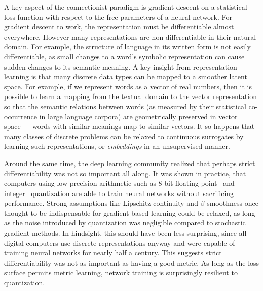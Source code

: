 \documentclass[12pt,initial,twoside,maitrise]{dms}
\numberwithin{equation}{section}
\numberwithin{table}{chapter}
\numberwithin{figure}{chapter}
\begin{document}
A key aspect of the connectionist paradigm is gradient descent on a statistical loss function with respect to the free parameters of a neural network. For gradient descent to work, the representation must be differentiable almost everywhere. However many representations are non-differentiable in their natural domain. For example, the structure of language in its written form is not easily differentiable, as small changes to a word's symbolic representation can cause sudden changes to its semantic meaning. A key insight from representation learning is that many discrete data types can be mapped to a smoother latent space. For example, if we represent words as a vector of real numbers, then it is possible to learn a mapping from the textual domain to the vector representation so that the semantic relations between words (as measured by their statistical co-occurrence in large language corpora) are geometrically preserved in vector space~\citep{pennington2014glove} -- words with similar meanings map to similar vectors. It so happens that many classes of discrete problems can be relaxed to continuous surrogates by learning such representations, or \textit{embeddings} in an unsupervised manner.

Around the same time, the deep learning community realized that perhaps strict differentiability was not so important all along. It was shown in practice, that computers using low-precision arithmetic such as 8-bit floating point~\citep{wang2018training} and integer~\citep{jacob2018quantization} quantization are able to train neural networks without sacrificing performance. Strong assumptions like Lipschitz-continuity and $\beta$-smoothness once thought to be indispensable for gradient-based learning could be relaxed, as long as the noise introduced by quantization was negligible compared to stochastic gradient methods. In hindsight, this should have been less surprising, since all digital computers use discrete representations anyway and were capable of training neural networks for nearly half a century. This suggests strict differentiability was not as important as having a good metric. As long as the loss surface permits metric learning, network training is surprisingly resilient to quantization.
\end{document}
